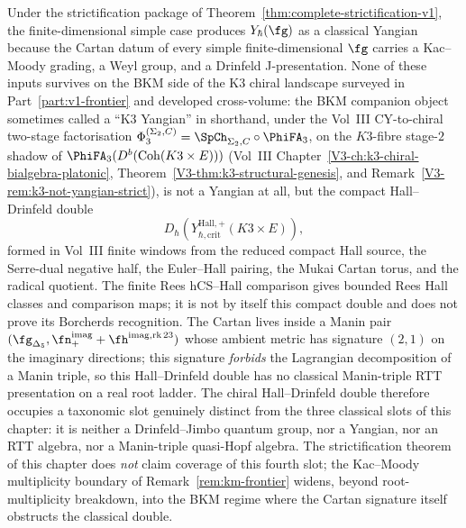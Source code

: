\begin{remark}
\label{rem:oackd-1}
%
%
%
Under the strictification package of
Theorem~\ref{thm:complete-strictification-v1}, the finite-dimensional
simple case produces $Y_\hbar(\fg)$ as a classical Yangian because the Cartan datum
of every simple finite-dimensional $\fg$ carries a Kac--Moody grading,
a Weyl group, and a Drinfeld J-presentation. None of these inputs
survives on the BKM side of the K3 chiral landscape surveyed in
Part~\ref{part:v1-frontier} and developed cross-volume: the
BKM companion object sometimes called a ``K3 Yangian'' in shorthand,
under the Vol~III CY-to-chiral two-stage factorisation
$\Phi_3^{(\Sigma_2,C)} = \SpCh_{\Sigma_2, C} \circ \PhiFA_3$, on the $K3$-fibre
stage-$2$ shadow of $\PhiFA_3(D^b(\mathrm{Coh}(K3 \times E)))$
\textup{(}Vol~III Chapter~\ref{V3-ch:k3-chiral-bialgebra-platonic},
Theorem~\ref{V3-thm:k3-structural-genesis}, and
Remark~\ref{V3-rem:k3-not-yangian-strict}\textup{)}, is not a
Yangian at all, but the
compact Hall--Drinfeld double
\[
D_\hbar\!\left(Y_{\hbar,\mathrm{crit}}^{\mathrm{Hall},+}(K3\times E)\right),
\]
formed in Vol~III finite windows from the reduced compact Hall source,
the Serre-dual negative half, the Euler--Hall pairing, the Mukai Cartan
torus, and the radical quotient. The finite Rees hCS--Hall comparison
gives bounded Rees Hall classes and comparison maps; it is not by
itself this compact double and does not prove its Borcherds
recognition. The Cartan lives
inside a Manin
pair $(\fg_{\Delta_5}, \fn_+^{\mathrm{imag}} + \fh^{\mathrm{imag},\mathrm{rk}\,23})$
whose ambient metric has signature $(2,1)$ on the imaginary directions;
this signature \emph{forbids} the Lagrangian decomposition of a Manin
triple, so this Hall--Drinfeld double has no classical Manin-triple
RTT presentation on a real root ladder. The chiral
Hall--Drinfeld double therefore occupies a taxonomic slot genuinely
distinct from the three classical slots of this chapter: it is
neither a Drinfeld--Jimbo quantum group, nor a Yangian, nor an RTT
algebra, nor a Manin-triple quasi-Hopf algebra. The strictification
theorem of this chapter does \emph{not} claim coverage of this fourth
slot; the Kac--Moody multiplicity boundary of
Remark~\ref{rem:km-frontier} widens, beyond root-multiplicity
breakdown, into the BKM regime where the Cartan signature itself
obstructs the classical double.
\end{remark}

